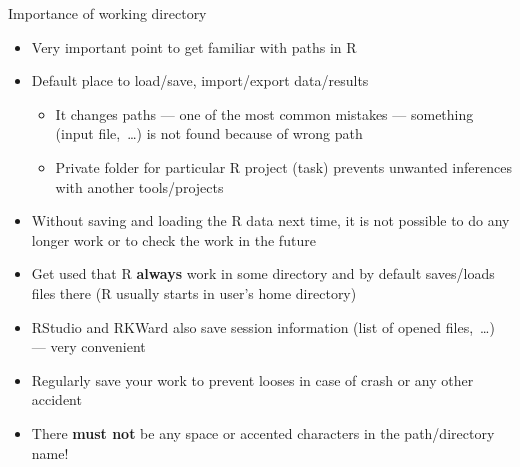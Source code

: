 \documentclass[compress, xelatex, 11pt, xcolor=svgnames, aspectratio=169, url={hyphens, lowtilde}]{beamer}
\begin{document}
\begin{frame}{Importance of working directory}
	\begin{itemize}
		\item Very important point to get familiar with paths in R
		\item Default place to load/save, import/export data/results
		\begin{itemize}
			\item It changes paths --- one of the most common mistakes --- something (input file,~\ldots) is not found because of wrong path
			\item Private folder for particular R project (task) prevents unwanted inferences with another tools/projects
		\end{itemize}
		\item Without saving and loading the R data next time, it is not possible to do any longer work or to check the work in the future
		\item \alert{Get used that R \textbf{always} work in some directory and by default saves/loads files there} (R usually starts in user's home directory)
		\item RStudio and RKWard also save session information (list of opened files,~\ldots) --- very convenient
		\item Regularly save your work to prevent looses in case of crash or any other accident
		\item \alert{There \textbf{must not} be any space or accented characters in the path/directory name!}
	\end{itemize}
\end{frame}
\end{document}
